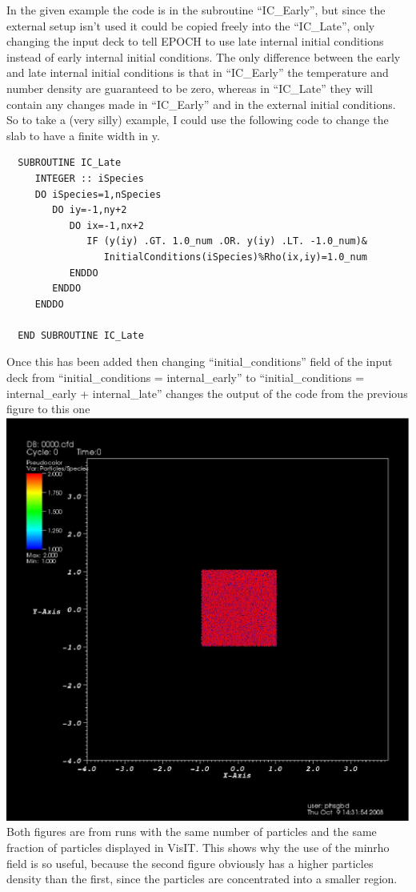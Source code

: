 \documentclass[12pt]{article}
\begin{document}
In the given example the code is in the subroutine ``IC\_Early'', but since the external setup isn't used it could be copied freely into the ``IC\_Late'', only changing the input deck to tell EPOCH to use late internal initial conditions instead of early internal initial conditions. The only difference between the early and late internal initial conditions is that in ``IC\_Early'' the temperature and number density are guaranteed to be zero, whereas in ``IC\_Late'' they will contain any changes made in ``IC\_Early'' and in the external initial conditions. So to take a (very silly) example, I could use the following code to change the slab to have a finite width in y.

\begin{verbatim}
  SUBROUTINE IC_Late
     INTEGER :: iSpecies
     DO iSpecies=1,nSpecies
        DO iy=-1,ny+2
           DO ix=-1,nx+2
              IF (y(iy) .GT. 1.0_num .OR. y(iy) .LT. -1.0_num)&
                 InitialConditions(iSpecies)%Rho(ix,iy)=1.0_num
           ENDDO
        ENDDO
     ENDDO
     
  END SUBROUTINE IC_Late
\end{verbatim}
Once this has been added then changing ``initial\_conditions'' field of the input deck from ``initial\_conditions = internal\_early'' to ``initial\_conditions = internal\_early + internal\_late'' changes the output of the code from the previous figure to this one\\
{\center \includegraphics{./images/example2.eps}\\}
Both figures are from runs with the same number of particles and the same fraction of particles displayed in VisIT. This shows why the use of the minrho field is so useful, because the second figure obviously has a higher particles density than the first, since the particles are concentrated into a smaller region.
\end{document}

